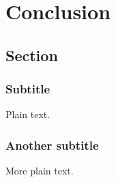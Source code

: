 
\chapter{Conclusion}

\section{Section}

\subsection{Subtitle}

Plain text.

\subsection{Another subtitle}

More plain text.